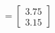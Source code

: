 \documentclass[preview]{standalone}
\begin{document}
\begin{align*}
= \begin{bmatrix} 3.75 \\ 3.15 \end{bmatrix}
\end{align*}
\end{document}
